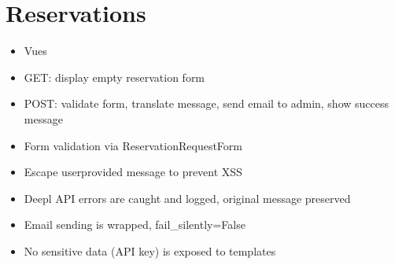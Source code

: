 \documentclass[letterpaper,10pt,french]{sphinxmanual}
\begin{document}
\section{Reservations}
\label{\detokenize{index:reservations}}\begin{itemize}
\item {} 
\sphinxAtStartPar
Vues

\end{itemize}
\label{\detokenize{index:module-reservations.views}}

\begin{fulllineitems}
\label{\detokenize{index:reservations.views.reservation_request_view}}
\pysigstartsignatures
\pysiglinewithargsret
{}
{}
{}
\pysigstopsignatures\begin{description}
\begin{itemize}
\item {} 
\sphinxAtStartPar
GET: display empty reservation form

\item {} 
\sphinxAtStartPar
POST: validate form, translate message, send email to admin, show success message

\end{itemize}

\begin{itemize}
\item {} 
\sphinxAtStartPar
Form validation via ReservationRequestForm

\item {} 
\sphinxAtStartPar
Escape user\sphinxhyphen{}provided message to prevent XSS

\item {} 
\sphinxAtStartPar
Deepl API errors are caught and logged, original message preserved

\item {} 
\sphinxAtStartPar
Email sending is wrapped, fail\_silently=False

\item {} 
\sphinxAtStartPar
No sensitive data (API key) is exposed to templates

\end{itemize}

\end{description}

\end{fulllineitems}
\end{document}
